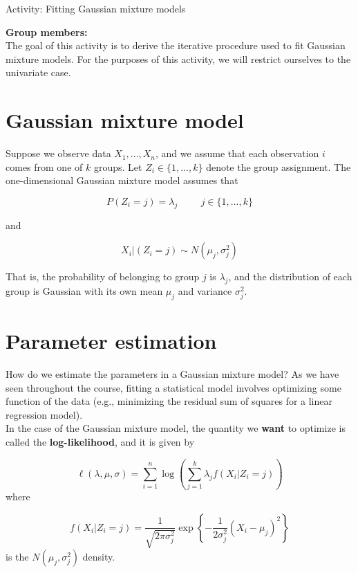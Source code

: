 \documentclass[12pt]{article}
\begin{document}
\begin{center}
\Large
Activity: Fitting Gaussian mixture models \\
\normalsize
\vspace{5mm}
\end{center}

\noindent \textbf{Group members:}\\

The goal of this activity is to derive the iterative procedure used to fit Gaussian mixture models. For the purposes of this activity, we will restrict ourselves to the univariate case.

\section*{Gaussian mixture model}

Suppose we observe data $X_1,...,X_n$, and we assume that each observation $i$ comes from one of $k$ groups. Let $Z_i \in \{1,...,k\}$ denote the group assignment. The one-dimensional Gaussian mixture model assumes that

$$P(Z_i = j) = \lambda_j \hspace{1cm} j \in \{1,...,k\}$$

and

$$X_i | (Z_i = j) \sim N(\mu_j, \sigma_j^2)$$

That is, the probability of belonging to group $j$ is $\lambda_j$, and the distribution of each group is Gaussian with its own mean $\mu_j$ and variance $\sigma_j^2$.

\section*{Parameter estimation}

How do we estimate the parameters in a Gaussian mixture model? As we have seen throughout the course, fitting a statistical model involves optimizing some function of the data (e.g., minimizing the residual sum of squares for a linear regression model).\\

In the case of the Gaussian mixture model, the quantity we \textbf{want} to optimize is called the \textbf{log-likelihood}, and it is given by

$$\ell(\lambda, \mu, \sigma) = \sum \limits_{i=1}^n \log \left( \sum \limits_{j=1}^k \lambda_j f(X_i | Z_i = j) \right)$$
where

$$f(X_i | Z_i = j) = \frac{1}{\sqrt{2 \pi \sigma_j^2}} \exp \left\lbrace -\frac{1}{2\sigma_j^2} (X_i - \mu_j)^2 \right\rbrace$$
is the $N(\mu_j, \sigma_j^2)$ density.
\end{document}

